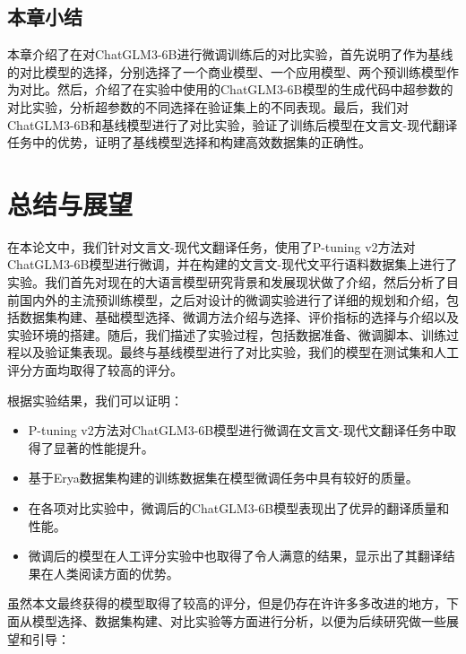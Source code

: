 \documentclass[
    decl-page,  %
    ,fontset = win, %
  ]{njuthesis}
\begin{document}
\section{本章小结}
本章介绍了在对ChatGLM3-6B进行微调训练后的对比实验，首先说明了作为基线的对比模型的选择，分别选择了一个商业模型、一个应用模型、两个预训练模型作为对比。然后，介绍了在实验中使用的ChatGLM3-6B模型的生成代码中超参数的对比实验，分析超参数的不同选择在验证集上的不同表现。最后，我们对ChatGLM3-6B和基线模型进行了对比实验，验证了训练后模型在文言文-现代翻译任务中的优势，证明了基线模型选择和构建高效数据集的正确性。

\chapter{总结与展望}
在本论文中，我们针对文言文-现代文翻译任务，使用了P-tuning v2方法对ChatGLM3-6B模型进行微调，并在构建的文言文-现代文平行语料数据集上进行了实验。我们首先对现在的大语言模型研究背景和发展现状做了介绍，然后分析了目前国内外的主流预训练模型，之后对设计的微调实验进行了详细的规划和介绍，包括数据集构建、基础模型选择、微调方法介绍与选择、评价指标的选择与介绍以及实验环境的搭建。随后，我们描述了实验过程，包括数据准备、微调脚本、训练过程以及验证集表现。最终与基线模型进行了对比实验，我们的模型在测试集和人工评分方面均取得了较高的评分。

根据实验结果，我们可以证明：

\begin{itemize}
    \item P-tuning v2方法对ChatGLM3-6B模型进行微调在文言文-现代文翻译任务中取得了显著的性能提升。
    \item 基于Erya数据集构建的训练数据集在模型微调任务中具有较好的质量。
    \item 在各项对比实验中，微调后的ChatGLM3-6B模型表现出了优异的翻译质量和性能。
    \item 微调后的模型在人工评分实验中也取得了令人满意的结果，显示出了其翻译结果在人类阅读方面的优势。
\end{itemize}

虽然本文最终获得的模型取得了较高的评分，但是仍存在许许多多改进的地方，下面从模型选择、数据集构建、对比实验等方面进行分析，以便为后续研究做一些展望和引导：
\end{document}
